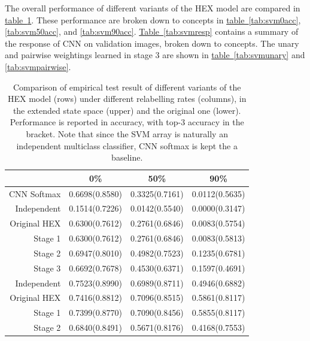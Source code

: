 \documentclass[11pt,a4paper]{book}
\begin{document}
The overall performance of different variants of the HEX model are compared in \hyperref[tab:svmacc]{table~\ref{tab:svmacc}}. These performance are broken down to concepts in \hyperref[tab:svm0acc]{table~\ref{tab:svm0acc}}, \ref{tab:svm50acc}, and \ref{tab:svm90acc}. \hyperref[tab:svmresp]{Table~\ref{tab:svmresp}} contains a summary of the response of CNN on validation images, broken down to concepts. The unary and pairwise weightings learned in stage 3 are shown in \hyperref[tab:svmunary]{table~\ref{tab:svmunary}} and \ref{tab:svmpairwise}.

\begin{table}[htbp]
\centering
\begin{tabular}{r|c|c|c}
 & 0\% & 50\% & 90\%\\
\hline
CNN Softmax  & 0.6698(0.8580) & 0.3325(0.7161) & 0.0112(0.5635)\\
Independent  & 0.1514(0.7226) & 0.0142(0.5540) & 0.0000(0.3147)\\
Original HEX & 0.6300(0.7612) & 0.2761(0.6846) & 0.0083(0.5754)\\
Stage 1      & 0.6300(0.7612) & 0.2761(0.6846) & 0.0083(0.5813)\\
Stage 2      & 0.6947(0.8010) & 0.4982(0.7523) & 0.1235(0.6781)\\
Stage 3      & 0.6692(0.7678) & 0.4530(0.6371) & 0.1597(0.4691)\\
\hline
Independent  & 0.7523(0.8990) & 0.6989(0.8711) & 0.4946(0.6882)\\
Original HEX & 0.7416(0.8812) & 0.7096(0.8515) & 0.5861(0.8117)\\
Stage 1      & 0.7399(0.8770) & 0.7090(0.8456) & 0.5855(0.8117)\\
Stage 2      & 0.6840(0.8491) & 0.5671(0.8176) & 0.4168(0.7553)
\end{tabular}
\caption{Comparison of empirical test result of different variants of the 	HEX model (rows) under different relabelling rates (columns), in the extended state space (upper) and the original one (lower). Performance is reported in accuracy, with top-3 accuracy in the bracket. Note that since the SVM array is naturally an independent multiclass classifier, CNN softmax is kept the a baseline.}
\label{tab:svmacc}
\end{table}
\end{document}
